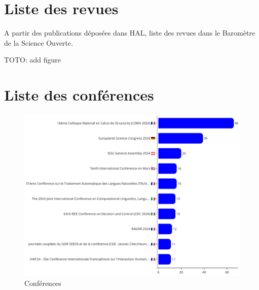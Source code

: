 \documentclass[french, 11pt]{dibiso/biso}
\begin{document}




\pagebreak

\section{Liste des revues}

A partir des publications déposées dans HAL, liste des revues dans le Baromètre de la Science Ouverte.

TOTO: add figure
%  







\pagebreak

\section{Liste des conférences}

\begin{figure}[!h]
  \includegraphics[width=\textwidth]{figures/conferences.pdf}
  \centering
  \caption{Conférences}
  \label{fig_conferences}
\end{figure}

\end{document}
